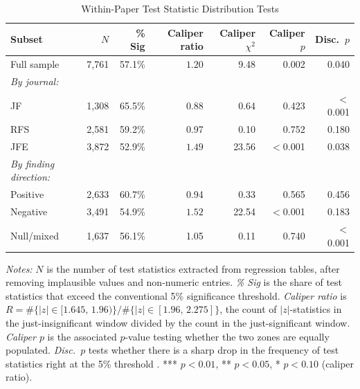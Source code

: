 \documentclass[12pt]{article}
\begin{document}
\begin{table}[H]
\centering
\caption{Within-Paper Test Statistic Distribution Tests}
\label{tab:pvalue_dist}
\begin{singlespace}
\small
\begin{tabular}{lrrrrrr}
\hline\hline
Subset & $N$ & \% Sig & Caliper ratio & Caliper $\chi^2$ & Caliper $p$ & Disc.\ $p$ \\
\hline
Full sample        & 7,761 & 57.1\% & $1.20$\rlap{$^{***}$} & 9.48 & 0.002 & 0.040 \\[2pt]
\textit{By journal:} \\
\quad JF           & 1,308 & 65.5\% & 0.88 & 0.64 & 0.423 & $<$0.001 \\
\quad RFS          & 2,581 & 59.2\% & 0.97 & 0.10 & 0.752 & 0.180 \\
\quad JFE          & 3,872 & 52.9\% & $1.49$\rlap{$^{***}$} & 23.56 & $<$0.001 & 0.038 \\[2pt]
\textit{By finding direction:} \\
\quad Positive      & 2,633 & 60.7\% & 0.94 & 0.33 & 0.565 & 0.456 \\
\quad Negative      & 3,491 & 54.9\% & $1.52$\rlap{$^{***}$} & 22.54 & $<$0.001 & 0.183 \\
\quad Null/mixed    & 1,637 & 56.1\% & 1.05 & 0.11 & 0.740 & $<$0.001 \\
\hline\hline
\end{tabular}
\begin{minipage}{\textwidth}
\smallskip
\footnotesize
\textit{Notes:} $N$ is the number of test statistics extracted from regression
tables, after removing implausible values and non-numeric entries.
\textit{\% Sig} is the share of test statistics that exceed the conventional
5\% significance threshold.
\textit{Caliper ratio} is
$R = \#\{|z|\in[1.645,\,1.96)\}/\#\{|z|\in[1.96,\,2.275]\}$, the count of
$|z|$-statistics in the just-insignificant window divided by the count in the
just-significant window.
\textit{Caliper $p$} is the associated $p$-value testing whether the two
zones are equally populated.
\textit{Disc.\ $p$} tests whether there is a sharp drop in the frequency of
test statistics right at the 5\% threshold \citep*{Brodeur2016}.
*** $p < 0.01$, ** $p < 0.05$, * $p < 0.10$ (caliper ratio).
\end{minipage}
\end{singlespace}
\end{table}
\end{document}
